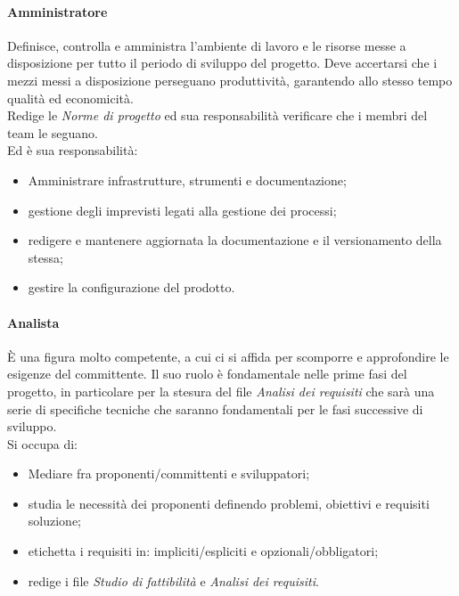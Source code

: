         \paragraph{Amministratore}
            Definisce, controlla e amministra l'ambiente di lavoro e le risorse messe a disposizione per tutto il periodo di sviluppo del progetto.
            Deve accertarsi che i mezzi messi a disposizione perseguano produttività, garantendo allo stesso tempo qualità ed economicità. \\
            Redige le \emph{Norme di progetto} ed sua responsabilità verificare che i membri del team le seguano. \\
            Ed \`e sua responsabilità:
            \begin{itemize}
                \item Amministrare infrastrutture, strumenti e documentazione;
                \item gestione degli imprevisti legati alla gestione dei processi;
                \item redigere e mantenere aggiornata la documentazione e il versionamento della stessa;
                \item gestire la configurazione del prodotto.
            \end{itemize}
        \paragraph{Analista}
            \`E una figura molto competente, a cui ci si affida per scomporre e approfondire le esigenze del committente. Il suo ruolo è fondamentale nelle prime fasi del progetto, in particolare per la stesura del file \emph{Analisi dei requisiti} che sarà una serie di specifiche tecniche che saranno fondamentali per le fasi successive di sviluppo. \\
            Si occupa di:
            \begin{itemize}
                \item Mediare fra proponenti/committenti e sviluppatori;
                \item studia le necessità dei proponenti definendo problemi, obiettivi e requisiti soluzione;
                \item etichetta i requisiti in: impliciti/espliciti e opzionali/obbligatori;
                \item redige i file \emph{Studio di fattibilità} e \emph{Analisi dei requisiti}.
            \end{itemize}
